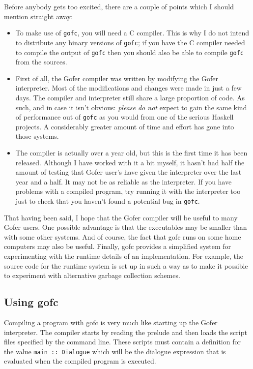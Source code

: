 Before anybody gets too excited, there are a couple of points which I
should mention straight away:
\begin{itemize}
\item  To make use of \verb"gofc", you will need a C compiler.  This is why I
     do not intend to distribute any binary versions of \verb"gofc"; if you
     have the C compiler needed to compile the output of \verb"gofc" then
     you should also be able to compile \verb"gofc" from the sources.

\item  First of all, the Gofer compiler was written by modifying the
     Gofer interpreter.  Most of the modifications and changes were
     made in just a few days.  The compiler and interpreter still
     share a large proportion of code.  As such, and in case it isn't
     obvious: {\em please do not} expect to gain the same kind of performance
     out of \verb"gofc" as you would from one of the serious Haskell
     projects.  A considerably greater amount of time and effort has
     gone into those systems.

\item  The compiler is actually over a year old, but this is the first
     time it has been released.  Although I have worked with it a bit
     myself, it hasn't had half the amount of testing that Gofer user's
     have given the interpreter over the last year and a half.  It may
     not be as reliable as the interpreter.  If you have problems with
     a compiled program, try running it with the interpreter too just
     to check that you haven't found a potential bug in \verb"gofc".
\end{itemize}

That having been said, I hope that the Gofer compiler will be useful to
many Gofer users.  One possible advantage is that the executables may
be smaller than with some other systems.  And of course, the fact that
gofc runs on some home computers may also be useful.  Finally, gofc
provides a simplified system for experimenting with the runtime details
of an implementation.  For example, the source code for the runtime
system is set up in such a way as to make it possible to experiment
with alternative garbage collection schemes.


\subsection{Using gofc}
Compiling a program with gofc is very much like starting up the Gofer
interpreter.  The compiler starts by reading the prelude and then
loads the script files specified by the command line.  These scripts
must contain a definition for the value \verb"main :: Dialogue" which will be
the dialogue expression that is evaluated when the compiled program is
executed.

